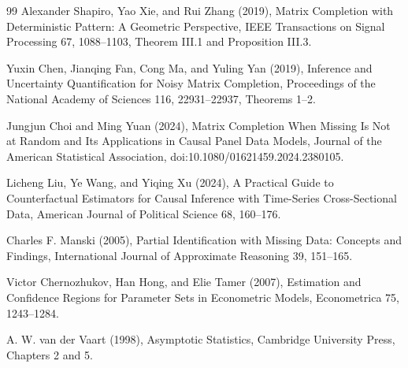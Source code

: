 \documentclass{article}
\begin{document}
\begin{thebibliography}{99}
   Alexander Shapiro, Yao Xie, and Rui Zhang (2019), Matrix Completion with Deterministic Pattern: A Geometric Perspective, IEEE Transactions on Signal Processing 67, 1088--1103, Theorem III.1 and Proposition III.3.

   Yuxin Chen, Jianqing Fan, Cong Ma, and Yuling Yan (2019), Inference and Uncertainty Quantification for Noisy Matrix Completion, Proceedings of the National Academy of Sciences 116, 22931--22937, Theorems 1--2.

   Jungjun Choi and Ming Yuan (2024), Matrix Completion When Missing Is Not at Random and Its Applications in Causal Panel Data Models, Journal of the American Statistical Association, doi:10.1080/01621459.2024.2380105.

   Licheng Liu, Ye Wang, and Yiqing Xu (2024), A Practical Guide to Counterfactual Estimators for Causal Inference with Time-Series Cross-Sectional Data, American Journal of Political Science 68, 160--176.

   Charles F. Manski (2005), Partial Identification with Missing Data: Concepts and Findings, International Journal of Approximate Reasoning 39, 151--165.

   Victor Chernozhukov, Han Hong, and Elie Tamer (2007), Estimation and Confidence Regions for Parameter Sets in Econometric Models, Econometrica 75, 1243--1284.

   A. W. van der Vaart (1998), Asymptotic Statistics, Cambridge University Press, Chapters 2 and 5.

\end{thebibliography}
\end{document}
